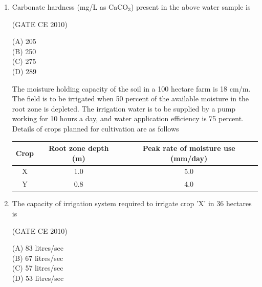 \documentclass[journal,12pt,onecolumn]{exam}
\theoremstyle{remark}
\begin{document}
\begin{enumerate}
\setlength{\parskip}{0.5cm}

\hfill{(GATE CE 2010)}

\begin{multicols}{4}
\noindent(A) 205\\
(B) 250\\
(C) 275\\
(D) 308
\end{multicols}

\setlength{\parskip}{0.5cm}
\noindent\item Carbonate hardness (mg/L as CaCO\(_3\)) present in the above water sample is

\setlength{\parskip}{0.5cm}

\hfill{(GATE CE 2010)}

\begin{multicols}{4}
\noindent(A) 205\\
(B) 250\\
(C) 275\\
(D) 289
\end{multicols}

\setlength{\parskip}{0.5cm}


\noindent The moisture holding capacity of the soil in a 100 hectare farm is 18 cm/m. The field is to be irrigated when 50 percent of the available moisture in the root zone is depleted. The irrigation water is to be supplied by a pump working for 10 hours a day, and water application efficiency is 75 percent. Details of crops planned for cultivation are as follows

\begin{table}[H]
\centering
\begin{tabular}{|c|c|c|}
\hline
Crop & Root zone depth (m) & Peak rate of moisture use (mm/day) \\
\hline
X & 1.0 & 5.0 \\
Y & 0.8 & 4.0 \\
\hline
\end{tabular}
\label{table5}
\end{table}
\noindent\item The capacity of irrigation system required to irrigate crop 'X' in 36 hectares is

\setlength{\parskip}{0.5cm}

\hfill{(GATE CE 2010)}

\begin{multicols}{4}
\noindent(A) 83 litres/sec\\
(B) 67 litres/sec\\
(C) 57 litres/sec\\
(D) 53 litres/sec
\end{multicols}


\end{enumerate}
\end{document}

